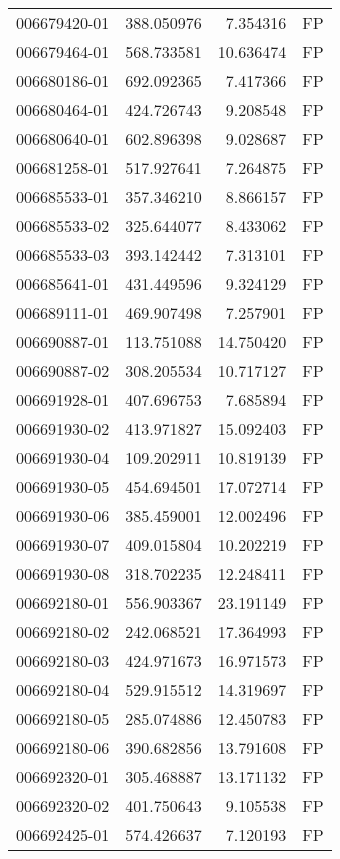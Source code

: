 \begin{tabular}{lrrl}
006679420-01 &  388.050976 &     7.354316 &   FP \\
006679464-01 &  568.733581 &    10.636474 &   FP \\
006680186-01 &  692.092365 &     7.417366 &   FP \\
006680464-01 &  424.726743 &     9.208548 &   FP \\
006680640-01 &  602.896398 &     9.028687 &   FP \\
006681258-01 &  517.927641 &     7.264875 &   FP \\
006685533-01 &  357.346210 &     8.866157 &   FP \\
006685533-02 &  325.644077 &     8.433062 &   FP \\
006685533-03 &  393.142442 &     7.313101 &   FP \\
006685641-01 &  431.449596 &     9.324129 &   FP \\
006689111-01 &  469.907498 &     7.257901 &   FP \\
006690887-01 &  113.751088 &    14.750420 &   FP \\
006690887-02 &  308.205534 &    10.717127 &   FP \\
006691928-01 &  407.696753 &     7.685894 &   FP \\
006691930-02 &  413.971827 &    15.092403 &   FP \\
006691930-04 &  109.202911 &    10.819139 &   FP \\
006691930-05 &  454.694501 &    17.072714 &   FP \\
006691930-06 &  385.459001 &    12.002496 &   FP \\
006691930-07 &  409.015804 &    10.202219 &   FP \\
006691930-08 &  318.702235 &    12.248411 &   FP \\
006692180-01 &  556.903367 &    23.191149 &   FP \\
006692180-02 &  242.068521 &    17.364993 &   FP \\
006692180-03 &  424.971673 &    16.971573 &   FP \\
006692180-04 &  529.915512 &    14.319697 &   FP \\
006692180-05 &  285.074886 &    12.450783 &   FP \\
006692180-06 &  390.682856 &    13.791608 &   FP \\
006692320-01 &  305.468887 &    13.171132 &   FP \\
006692320-02 &  401.750643 &     9.105538 &   FP \\
006692425-01 &  574.426637 &     7.120193 &   FP \\

\end{tabular}
